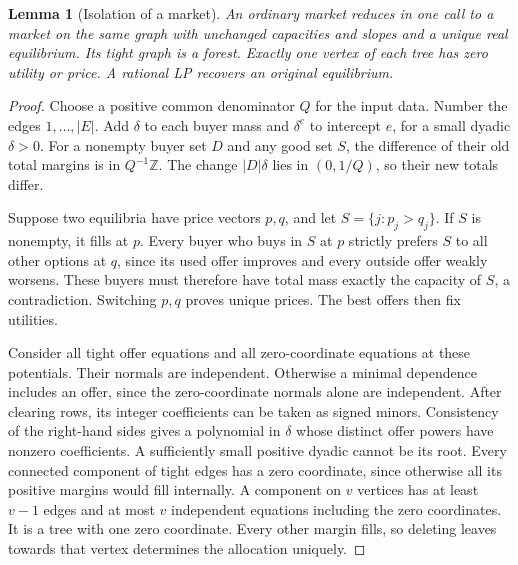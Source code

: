 \documentclass[11pt,oneside,openany,notitlepage]{report}
\newtheorem{lemma}[theorem]{Lemma}
\begin{document}
\begin{lemma}[Isolation of a market]\label{lem:isolate}
An ordinary market reduces in one call to a market on the same graph
with unchanged capacities and slopes and a unique real equilibrium.
Its tight graph is a forest. Exactly one vertex of each tree has zero
utility or price. A rational LP recovers an original equilibrium.
\end{lemma}
\begin{proof}
Choose a positive common denominator \(Q\) for the input data. Number
the edges \(1,\ldots,|E|\). Add \(\delta\) to each buyer mass and
\(\delta^e\) to intercept \(e\), for a small dyadic \(\delta>0\).
For a nonempty buyer set \(D\) and any good set \(S\), the difference
of their old total margins is in \(Q^{-1}\mathbb Z\). The change
\(|D|\delta\) lies in \((0,1/Q)\), so their new totals differ.

Suppose two equilibria have price vectors \(p,q\), and let
\(S=\{j:p_j>q_j\}\). If \(S\) is nonempty, it fills at \(p\). Every
buyer who buys in \(S\) at \(p\) strictly prefers \(S\) to all other
options at \(q\), since its used offer improves and every outside offer
weakly worsens. These buyers must therefore have total mass exactly
the capacity of \(S\), a contradiction. Switching \(p,q\) proves unique
prices. The best offers then fix utilities.

Consider all tight offer equations and all zero-coordinate equations at
these potentials. Their normals are independent. Otherwise a minimal
dependence includes an offer, since the zero-coordinate normals alone are
independent. After clearing rows, its integer coefficients can be taken as
signed minors. Consistency of the right-hand sides gives a polynomial in
\(\delta\) whose distinct offer powers have nonzero coefficients. A
sufficiently small positive dyadic cannot be its root. Every connected
component of tight edges has a zero coordinate, since otherwise all its
positive margins would fill internally. A component on \(v\) vertices
has at least \(v-1\) edges and at most \(v\) independent equations
including the zero coordinates. It is a tree with one zero coordinate.
Every other margin fills, so deleting leaves towards that vertex
determines the allocation uniquely.


\end{proof}
\end{document}
